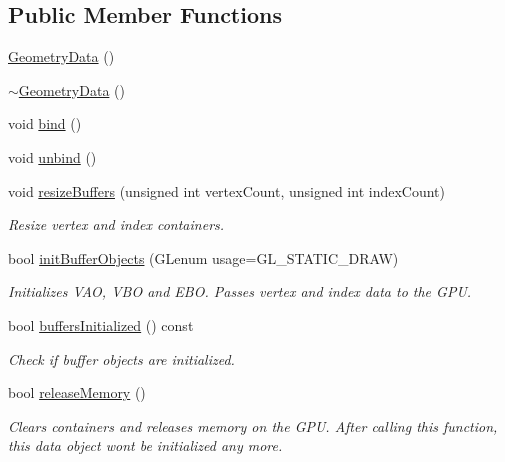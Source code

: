 \subsection*{Public Member Functions}
\begin{DoxyCompactItemize}
\item 
\mbox{\hyperlink{classec_1_1_geometry_data_a21db28a4c6d964c8bc59cc698170e77c}{Geometry\+Data}} ()
\item 
\mbox{\hyperlink{classec_1_1_geometry_data_ab0684d232286015d10fb40ab49836c84}{$\sim$\+Geometry\+Data}} ()
\item 
void \mbox{\hyperlink{classec_1_1_geometry_data_acb50971e6fbd928172731a3427d22691}{bind}} ()
\item 
void \mbox{\hyperlink{classec_1_1_geometry_data_abb54af4b2922eb16973b450d6cf0beae}{unbind}} ()
\item 
void \mbox{\hyperlink{classec_1_1_geometry_data_a85ce34e18732d88632310d751a6c2cee}{resize\+Buffers}} (unsigned int vertex\+Count, unsigned int index\+Count)
\begin{DoxyCompactList}\small\item\em Resize vertex and index containers. \end{DoxyCompactList}\item 
bool \mbox{\hyperlink{classec_1_1_geometry_data_ade0586602da2a8917fe55b592ff44a57}{init\+Buffer\+Objects}} (G\+Lenum usage=G\+L\+\_\+\+S\+T\+A\+T\+I\+C\+\_\+\+D\+R\+AW)
\begin{DoxyCompactList}\small\item\em Initializes V\+AO, V\+BO and E\+BO. Passes vertex and index data to the G\+PU. \end{DoxyCompactList}\item 
bool \mbox{\hyperlink{classec_1_1_geometry_data_a23c0090061b5b21b74f070916915ca69}{buffers\+Initialized}} () const
\begin{DoxyCompactList}\small\item\em Check if buffer objects are initialized. \end{DoxyCompactList}\item 
bool \mbox{\hyperlink{classec_1_1_geometry_data_a5df7921c489c60d96a971003c299dcb3}{release\+Memory}} ()
\begin{DoxyCompactList}\small\item\em Clears containers and releases memory on the G\+PU. After calling this function, this data object won\textquotesingle{}t be initialized any more. \end{DoxyCompactList}\item 

\end{DoxyCompactItemize}
